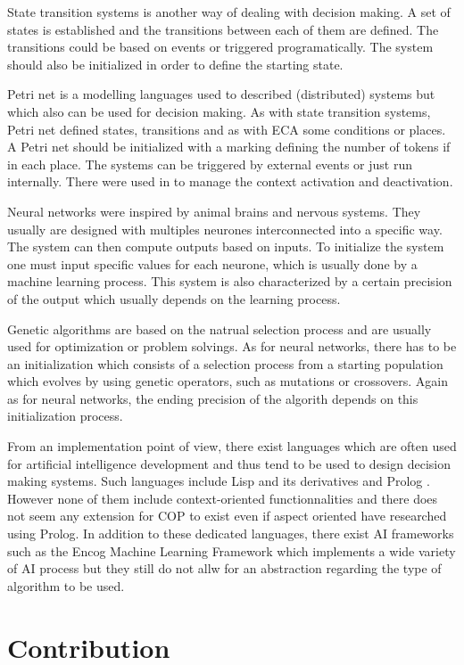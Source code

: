 \documentclass[a4paper]{article}
\begin{document}
State transition systems is another  way of dealing with decision making. A set of states is established and the transitions between each of them are defined. The transitions could be based on events or triggered programatically. The system should also be initialized in order to define the starting state.

Petri net is a modelling languages used to described (distributed) systems but which also can be used for decision making. As with state transition systems, Petri net defined states, transitions and as with ECA some conditions or places. A Petri net should be initialized with a marking defining the number of tokens if in each place. The systems can be triggered by external events or just run internally. There were used in \cite{cardozo_uniting_2012} to manage the context activation and deactivation.

Neural networks were inspired by animal brains and nervous systems. They usually are designed with multiples neurones interconnected into a specific way. The system can then compute outputs based on inputs. To initialize the system one must input specific values for each neurone, which is usually done by a machine learning process. This system is also characterized by a certain precision of the output which usually depends on the learning process.

Genetic algorithms are based on the natrual selection process and are usually used for optimization or problem solvings. As for neural networks, there has to be an initialization which consists of a selection process from a starting population which evolves by using genetic operators, such as mutations or crossovers. Again as for neural networks, the ending precision of the algorith depends on this initialization process.


From an implementation point of view, there exist languages which are often used for artificial intelligence development and thus tend to be used to design decision making systems. Such languages include Lisp and its derivatives and Prolog \cite{lohmann_aspect-oriented_2008}. However none of them include context-oriented functionnalities and there does not seem any extension for COP to exist even if aspect oriented have researched using Prolog. In addition to these dedicated languages, there exist AI frameworks such as the Encog Machine Learning Framework which implements a wide variety of AI process but they still do not allw for an abstraction regarding the type of algorithm to be used.

 
\section{Contribution}
\label{section:contribution}
\end{document}
